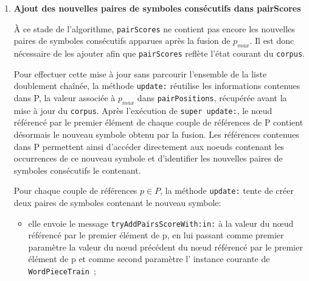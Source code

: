 \documentclass[12pt,a4paper]{report}
\begin{document}
\begin{enumerate}
\begin{enumerate}[label=\alph*)]
	 	La méthode \texttt{addToTokenFrequenciesAndTokenPositions:} reçoit en paramètre une instance de \texttt{Token}. Elle récupère le symbole contenu dans son attribut \texttt{token} et ajoute le symbole à \texttt{tokenFrequencies} avec un nombre d'occurrences égal à la valeur de l' attribut \texttt{occurence} de l'objet \texttt{Token}.
	 	
	 	La méthode met ensuite à jour \texttt{tokenPositions}. Si le symbole est déjà présent dans ce dictionnaire, la référence contenue dans l'attribut \texttt{position} de l'objet \texttt{Token} est ajoutée à l'ensemble des références qui lui est associé. Dans le cas contraire, la méthode ajoute le symbole dans \texttt{tokenPositions} et lui associe un ensemble contenant la référence stockée dans l'attribut \texttt{position} de l'objet \texttt{Token}.
	 	
	 	À l'issue de cette étape, \texttt{tokenFrequencies} et \texttt{tokenPositions} reflètent de nouveau l'état courant du corpus en prenant en compte les occurrences du nouveau symbole créées par la fusion.
	 	
	 	\item \textbf{Ajout des nouvelles paires de symboles consécutifs dans pairScores}
	 	
	 	À ce stade de l'algorithme, \texttt{pairScores} ne contient pas encore les nouvelles paires de symboles consécutifs apparues après la fusion de $p_{max}$. Il est donc nécessaire de les ajouter afin que \texttt{pairScores} reflète l'état courant du \texttt{corpus}.
	 	
	 	Pour effectuer cette mise à jour sans parcourir l'ensemble de la liste doublement chaînée, la méthode \texttt{update:} réutilise les informations contenues dans P, la valeur associée à $p_{max}$ dans \texttt{pairPositions}, récupérée avant la mise à jour du \texttt{corpus}. Après l'exécution de \texttt{super update:}, le nœud référencé par le premier élément de chaque couple de références de P contient désormais le nouveau symbole obtenu par la fusion. Les références contenues dans P permettent ainsi d'accéder directement aux noeuds contenant les occurrences de ce nouveau symbole et d'identifier les nouvelles paires de symboles consécutifs le contenant.
	 	
	 	Pour chaque couple de références $p \in P$, la méthode \texttt{update:} tente de créer deux paires de symboles contenant le nouveau symbole:
	 	
	 	\begin{itemize}
	 		\item elle envoie le message \texttt{tryAddPairsScoreWith:in:} à la valeur du nœud référencé par le premier élément de p, en lui passant comme premier paramètre la valeur du nœud précédent du nœud référencé par le premier élément de p et comme second paramètre l' instance courante de \texttt{WordPieceTrain };
	 		

\end{itemize}
\end{enumerate}
\end{enumerate}
\end{document}
